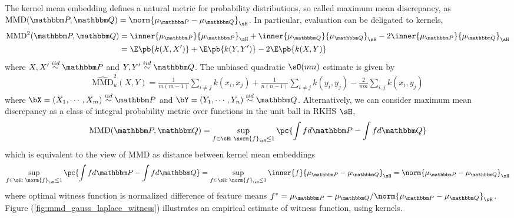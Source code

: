 \documentclass[11pt]{article}
\begin{document}
The kernel mean embedding defines a natural metric for probability distributions, so called maximum mean discrepancy, as $\text{MMD}(\bbP,\bbQ)
= \norm{\mu_{\bbP}-\mu_{\bbQ}}_{\sH}$. In particular, evaluation can be deligated to kernels, 
\begin{align}
    \text{MMD}^2(\bbP,\bbQ)
        &= \inner{\mu_{\bbP}}{\mu_{\bbP}}_{\sH} + \inner{\mu_{\bbQ}}{\mu_{\bbQ}}_{\sH} - 2\inner{\mu_{\bbP}}{\mu_{\bbQ}}_{\sH} \\
        &= \E\pb{k(X,X')} + \E\pb{k(Y,Y')} - 2\E\pb{k(X,Y)}
\end{align}
where $X,X'\overset{iid}{\sim} \bbP$ and $Y,Y'\overset{iid}{\sim} \bbQ$. The unbiased quadratic $\sO(mn)$ estimate is given by
\begin{align}
    \widehat{\text{MMD}}_u^2(X,Y)
        = \frac{1}{m(m-1)} \sum_{i\neq j} k(x_i,x_j) + \frac{1}{n(n-1)} \sum_{i\neq j} k(y_i,y_j) - \frac{2}{mn} \sum_{i,j} k(x_i,y_j)
\end{align}
where $\bX = (X_1,\cdots,X_m) \overset{iid}{\sim}\bbP$ and $\bY = (Y_1,\cdots,Y_n) \overset{iid}{\sim} \bbQ$. Alternatively, we can consider maximum mean discrepancy as a class of integral probability metric over functions in the unit ball in RKHS $\sH$,
\begin{align}
    \text{MMD}(\bbP,\bbQ)
        = \sup_{f\in\sH:\; \norm{f}_{\sH}\leq 1} \pc{
            \int f d\bbP - \int f d\bbQ
        }
\end{align}
which is equivalent to the view of MMD as distance between kernel mean embeddings
\begin{align}
    \sup_{f\in\sH:\; \norm{f}_{\sH}\leq 1} \pc{
            \int f d\bbP - \int f d\bbQ
        }
        = \sup_{f\in\sH:\; \norm{f}_{\sH}\leq 1} \inner{f}{\mu_{\bbP}-\mu_{\bbQ}}_{\sH}
        = \norm{\mu_{\bbP} - \mu_{\bbQ}}_{\sH}
\end{align}
where optimal witness function is normalized difference of feature means $f^* = \mu_{\bbP}-\mu_{\bbQ}/\norm{ \mu_{\bbP}-\mu_{\bbQ} }_{\sH}$. Figure (\ref{fig:mmd_gauss_laplace_witness}) illustrates an empirical estimate of witness function, using kernels.
\end{document}
